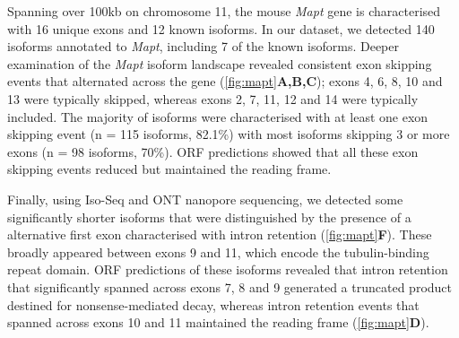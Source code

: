 Spanning over 100kb on chromosome 11, the mouse \textit{Mapt} gene is characterised with 16 unique exons and 12 known isoforms. In our dataset, we detected 140 isoforms annotated to \textit{Mapt}, including 7 of the known isoforms. Deeper examination of the \textit{Mapt} isoform landscape revealed consistent exon skipping events that alternated across the gene (\cref{fig:mapt}\textbf{A,B,C}); exons 4, 6, 8, 10 and 13 were typically skipped, whereas exons 2, 7, 11, 12 and 14 were typically included. The majority of isoforms were characterised with at least one exon skipping event (n = 115 isoforms, 82.1\%) with most isoforms skipping 3 or more exons (n = 98 isoforms, 70\%). ORF predictions showed that all these exon skipping events reduced but maintained the reading frame. 

Finally, using Iso-Seq and ONT nanopore sequencing, we detected some significantly shorter isoforms that were distinguished by the presence of a alternative first exon characterised with intron retention (\cref{fig:mapt}\textbf{F}). These broadly appeared between exons 9 and 11, which encode the tubulin-binding repeat domain. ORF predictions of these isoforms revealed that intron retention that significantly spanned across exons 7, 8 and 9 generated a truncated product destined for nonsense-mediated decay, whereas intron retention events that spanned across exons 10 and 11 maintained the reading frame (\cref{fig:mapt}\textbf{D}). 


